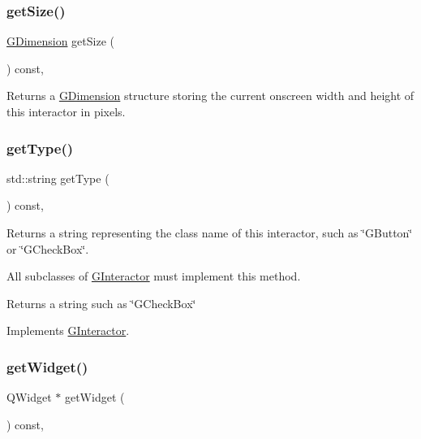 \subsubsection{\texorpdfstring{get\+Size()}{getSize()}}
{\footnotesize\ttfamily \mbox{\hyperlink{structGDimension}{G\+Dimension}} get\+Size (\begin{DoxyParamCaption}{ }\end{DoxyParamCaption}) const\hspace{0.3cm}{\ttfamily [virtual]}, {\ttfamily [inherited]}}



Returns a \mbox{\hyperlink{structGDimension}{G\+Dimension}} structure storing the current onscreen width and height of this interactor in pixels. 

\mbox{\label{classGCanvas_a9b72ede4ee8520f987a0c01e30654814}} 
\subsubsection{\texorpdfstring{get\+Type()}{getType()}}
{\footnotesize\ttfamily std\+::string get\+Type (\begin{DoxyParamCaption}{ }\end{DoxyParamCaption}) const\hspace{0.3cm}{\ttfamily [override]}, {\ttfamily [virtual]}}



Returns a string representing the class name of this interactor, such as \char`\"{}\+G\+Button\char`\"{} or \char`\"{}\+G\+Check\+Box\char`\"{}. 

All subclasses of \mbox{\hyperlink{classGInteractor}{G\+Interactor}} must implement this method. \begin{DoxyReturn}{Returns}
a string such as \char`\"{}\+G\+Check\+Box\char`\"{} 
\end{DoxyReturn}


Implements \mbox{\hyperlink{classGInteractor_a44c407a54a20dd0f2fff30338289299d}{G\+Interactor}}.

\mbox{\label{classGCanvas_a3b33a602b31a6b809d020535a59db3b4}} 
\subsubsection{\texorpdfstring{get\+Widget()}{getWidget()}}
{\footnotesize\ttfamily Q\+Widget $\ast$ get\+Widget (\begin{DoxyParamCaption}{ }\end{DoxyParamCaption}) const\hspace{0.3cm}{\ttfamily [override]}, {\ttfamily [virtual]}}



